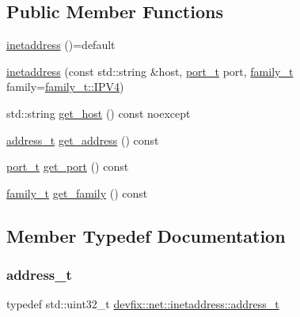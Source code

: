 \subsection*{Public Member Functions}
\begin{DoxyCompactItemize}
\item 
\hyperlink{structdevfix_1_1net_1_1inetaddress_a823bec9f0bc7437854ec9270c610756a}{inetaddress} ()=default
\item 
\hyperlink{structdevfix_1_1net_1_1inetaddress_a2b5fb7c7cb63230d6188c74d90e323dc}{inetaddress} (const std\+::string \&host, \hyperlink{structdevfix_1_1net_1_1inetaddress_a3eaadc730f2b4625987cf948ea485410}{port\+\_\+t} port, \hyperlink{structdevfix_1_1net_1_1inetaddress_a1c470962b4c9c675d475dba2344b50f4}{family\+\_\+t} family=\hyperlink{structdevfix_1_1net_1_1inetaddress_a1c470962b4c9c675d475dba2344b50f4ae638ca944d27f97f46a5986a5aa53434}{family\+\_\+t\+::\+I\+P\+V4})
\item 
std\+::string \hyperlink{structdevfix_1_1net_1_1inetaddress_a4524692fae7a767e38600012c6f8f3cf}{get\+\_\+host} () const noexcept
\item 
\hyperlink{structdevfix_1_1net_1_1inetaddress_a2eb252de4b894131be8fcda68118bd77}{address\+\_\+t} \hyperlink{structdevfix_1_1net_1_1inetaddress_a8c606f2398a2d3c9436c4932d6c590b2}{get\+\_\+address} () const
\item 
\hyperlink{structdevfix_1_1net_1_1inetaddress_a3eaadc730f2b4625987cf948ea485410}{port\+\_\+t} \hyperlink{structdevfix_1_1net_1_1inetaddress_ad2c4af8ffc473aebc58bc1bbe0277e7d}{get\+\_\+port} () const
\item 
\hyperlink{structdevfix_1_1net_1_1inetaddress_a1c470962b4c9c675d475dba2344b50f4}{family\+\_\+t} \hyperlink{structdevfix_1_1net_1_1inetaddress_a254e4950de6c6443a39196c6c7f58db4}{get\+\_\+family} () const
\end{DoxyCompactItemize}


\subsection{Member Typedef Documentation}
\mbox{\label{structdevfix_1_1net_1_1inetaddress_a2eb252de4b894131be8fcda68118bd77}} 
\subsubsection{\texorpdfstring{address\+\_\+t}{address\_t}}
{\footnotesize\ttfamily typedef std\+::uint32\+\_\+t \hyperlink{structdevfix_1_1net_1_1inetaddress_a2eb252de4b894131be8fcda68118bd77}{devfix\+::net\+::inetaddress\+::address\+\_\+t}}

